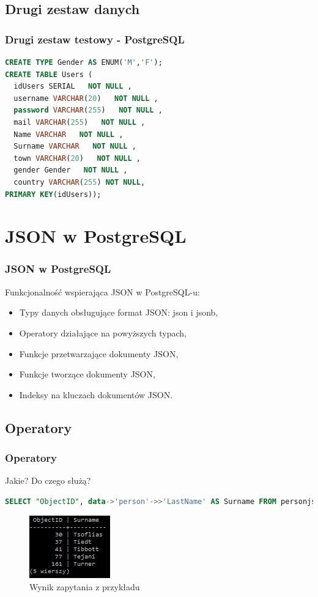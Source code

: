 \documentclass{beamer}
\begin{document}
\subsection{Drugi zestaw danych}
\begin{frame}[fragile]
\frametitle{Drugi zestaw testowy - PostgreSQL}

\begin{lstlisting}[language=SQL]
CREATE TYPE Gender AS ENUM('M','F');
CREATE TABLE Users (
  idUsers SERIAL   NOT NULL ,
  username VARCHAR(20)   NOT NULL ,
  password VARCHAR(255)   NOT NULL ,
  mail VARCHAR(255)   NOT NULL ,
  Name VARCHAR   NOT NULL ,
  Surname VARCHAR   NOT NULL ,
  town VARCHAR(20)   NOT NULL ,
  gender Gender   NOT NULL ,
  country VARCHAR(255) NOT NULL,
PRIMARY KEY(idUsers));
\end{lstlisting}
\vspace{0.5cm}

\end{frame}
\section{JSON w PostgreSQL}
\begin{frame}
\frametitle{JSON w PostgreSQL}
Funkcjonalność wspierająca JSON w PostgreSQL-u:
\begin{itemize}
\item Typy danych obsługujące format JSON: json i jsonb,
\item Operatory działające na powyższych typach,
\item Funkcje przetwarzające dokumenty JSON,
\item Funkcje tworzące dokumenty JSON,
\item Indeksy na kluczach dokumentów JSON.
\end{itemize}
\end{frame}
\subsection{Operatory}
\begin{frame}[fragile]
\frametitle{Operatory}
Jakie? Do czego służą?
\begin{lstlisting}[language=SQL,basicstyle=\footnotesize]
SELECT "ObjectID", data->'person'->>'LastName' AS Surname FROM personjsonb WHERE data->'person'->>'LastName' LIKE 'T%' LIMIT 5;
\end{lstlisting}
\vspace{0.5cm}
\begin{figure}[h]
\begin{center}
\includegraphics[scale=1.1]{sc/1}
\end{center}
\caption{Wynik zapytania z przykładu}
\end{figure}
\end{frame}
\end{document}
